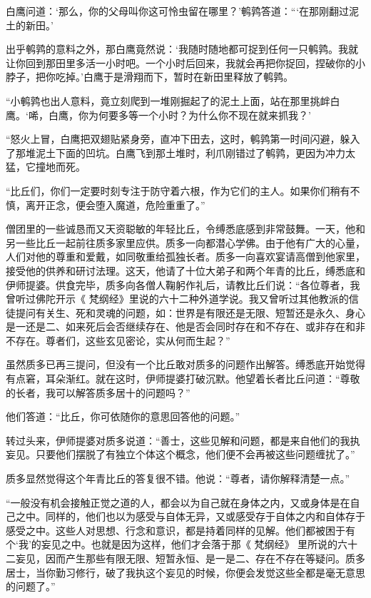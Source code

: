 \documentclass[12pt,twoside,openany]{book}
\begin{document}
白鹰问道：‘那么，你的父母叫你这可怜虫留在哪里？’鹌鹑答道：“‘在那刚翻过泥土的新田。’

出乎鹌鹑的意料之外，那白鹰竟然说：‘我随时随地都可捉到任何一只鹌鹑。我就让你回到那田里多活一小时吧。一个小时后回来，我就会再把你捉回，捏破你的小脖子，把你吃掉。’白鹰于是滑翔而下，暂时在新田里释放了鹌鹑。

“小鹌鹑也出人意料，竟立刻爬到一堆刚掘起了的泥土上面，站在那里挑衅白鹰。‘唏，白鹰，你为何要多等一个小时？为什么你不现在就来抓我？’

“怒火上冒，白鹰把双翅贴紧身旁，直冲下田去，这时，鹌鹑第一时间闪避，躲入了那堆泥土下面的凹坑。白鹰飞到那土堆时，利爪刚错过了鹌鹑，更因为冲力太猛，它撞地而死。

“比丘们，你们一定要时刻专注于防守着六根，作为它们的主人。如果你们稍有不慎，离开正念，便会堕入魔道，危险重重了。”

僧团里的一些诚恳而又天资聪敏的年轻比丘，令缚悉底感到非常鼓舞。一天，他和另一些比丘一起前往质多家里应供。质多一向都潜心学佛。由于他有广大的心量，人们对他的尊重和爱戴，如同敬重给孤独长者。质多一向喜欢宴请高僧到他家里，接受他的供养和研讨法理。这天，他请了十位大弟子和两个年青的比丘，缚悉底和伊师提婆。供食完毕，质多向各僧人鞠躬作礼后，请教比丘们说：“各位尊者，我曾听过佛陀开示《 梵纲经》里说的六十二种外道学说。我又曾听过其他教派的信徒提问有关生、死和灵魂的问题，如：世界是有限还是无限、短暂还是永久、身心是一还是二、如来死后会否继续存在、他是否会同时存在和不存在、或非存在和非不存在。尊者们，这些玄见密论，实从何而生起？”

虽然质多已再三提问，但没有一个比丘敢对质多的问题作出解答。缚悉底开始觉得有点窘，耳朵渐红。就在这时，伊师提婆打破沉默。他望着长者比丘问道：“尊敬的长者，我可以解答质多居十的问题吗？”

他们答道：“比丘，你可依随你的意思回答他的问题。”

转过头来，伊师提婆对质多说道：“善士，这些见解和问题，都是来自他们的我执妄见。只要他们摆脱了有独立个体这个概念，他们便不会再被这些问题缠扰了。”

质多显然觉得这个年青比丘的答复很不错。他说：“尊者，请你解释清楚一点。”

“一般没有机会接触正觉之道的人，都会以为自己就在身体之内，又或身体是在自己之中。同样的，他们也以为感受与自体无异，又或感受存于自体之内和自体存于感受之中。这些人对思想、行念和意识，都是持着同样的见解。他们都被困于有个‘我’的妄见之中。也就是因为这样，他们才会落于那《 梵纲经》 里所说的六十二妄见，因而产生那些有限无限、短暂永恒、是一是二、存在不存在等疑问。质多居士，当你勤习修行，破了我执这个妄见的时候，你便会发觉这些全都是毫无意思的问题了。”
\end{document}
